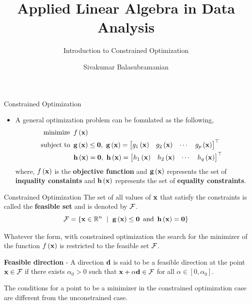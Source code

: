 \documentclass[aspectratio=169]{beamer}
\title{Applied Linear Algebra in Data Analysis}
\subtitle{Introduction to Constrained Optimization}
\author{Sivakumar Balasubramanian}
\institute[Christian Medical College] %
{
  \inst{}%
  Department of Bioengineering\\
  Christian Medical College, Bagayam\\
  Vellore 632002
}
\date{}
\let\olditem\item
\renewcommand{\item}{\setlength{\itemsep}{\fill}\olditem}
\def\mf{\ensuremath\mathbf}
\def\mb{\ensuremath\mathbb}
\def\mc{\ensuremath\mathcal}
\def\lp{\ensuremath\left(}
\def\rp{\ensuremath\right)}
\def\lc{\ensuremath\left\{}
\def\rc{\ensuremath\right\}}
\def\bmx{\ensuremath\begin{bmatrix*}[r]}
\def\emx{\ensuremath\end{bmatrix*}}
\newcommand{\ct}[1]{\lp #1\rp}
\begin{document}


\begin{frame}
  \titlepage
\end{frame}


\begin{frame}[t]{Constrained Optimization}
  \begin{itemize}
    \item A general optimization problem can be fomulated as the following,
    \[ \begin{split}
      \text{minimize}
      & \,\,\, f\ct{\mf{x}} \\
      \mathrm{subject \,\, to} & \,\,\, \mf{g}\ct{\mf{x}} \leq \mf{0}, \,\, \mf{g}\ct{\mf{x}} = \bmx g_1\ct{\mf{x}} & g_2\ct{\mf{x}} & \cdots & g_p\ct{\mf{x}}\emx^\top \\
      & \,\,\, \mf{h}\ct{\mf{x}} = \mf{0}, \,\, \mf{h}\ct{\mf{x}} = \bmx h_1\ct{\mf{x}} & h_2\ct{\mf{x}} & \cdots & h_q\ct{\mf{x}}\emx^\top \\
    \end{split} \]
    where, $f\ct{\mf{x}}$ is the \textbf{objective function} and $\mf{g}\ct{\mf{x}}$ represents the set of \textbf{inquality constaints} and $\mf{h}\ct{\mf{x}}$ represents the set of \textbf{equality constraints}.
  \end{itemize}
\end{frame}


\begin{frame}[t]{Constrained Optimization}
  The set of all values of $\mf{x}$ that satisfy the constraints is called the \textbf{feasible set} and is denoted by $\mc{F}$.
  \[ \mc{F} = \lc \mf{x} \in \mb{R}^n \,\,\mid \,\, \mf{g}\ct{\mf{x}} \leq \mf{0}  \, \text{ and } \, \mf{h}\ct{\mf{x}} = \mf{0} \rc \]
  \vspace{0.2cm}

  Whatever the form, with constrained optimization the search for the minimizer of the function $f\ct{\mf{x}}$ is restricted to the feasible set $\mc{F}$.
  \vspace{0.2cm}
  
  \textbf{Feasible direction} - A direction $\mf{d}$ is said to be a feasible direction at the point $\mf{x} \in \mc{F}$ if there exists $\alpha_0 > 0$ such that $\mf{x} + \alpha \mf{d} \in \mc{F}$ for all $\alpha \in [0, \alpha_0]$.
  \vspace{0.2cm}

  The conditions for a point to be a minimizer in the constrained optimization case are different from the unconstrained case.
\end{frame}
\end{document}
